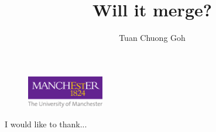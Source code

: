 \documentclass[12pt,BSc,wordcount, oneside]{muthesis}
\begin{document}
\begin{figure}
  \centering
  \includegraphics[width=0.3\textwidth]{uom_logo.pdf}
  \label{fig:uom_logo}
\end{figure} 

\title{Will it merge?}
\author{Tuan Chuong Goh}

\beforeabstract



\afterabstract

I would like to thank...

\afterpreface












\appendix

\end{document}
